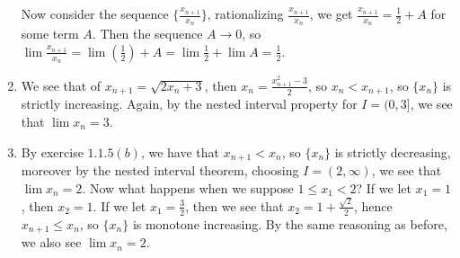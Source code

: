 \begin{enumerate}[label=(\arabic*)]
        Now consider the sequence  $\{\frac{x_{n+1}}{x_n}\}$, rationalizing 
        $\frac{x_{n+1}}{x_n}$, we get $\frac{x_{n+1}}{x_n}=\frac{1}{2}+A$ for some 
        term $A$. Then the sequence  $A \rightarrow 0$, so $\lim{\frac{x_{n+1}}{x_n}}=
        \lim{(\frac{1}{2})+A}=\lim{\frac{1}{2}}+\lim{A}=\frac{1}{2}$.

    \item We see that of $x_{n+1}=\sqrt{2x_n+3}$, then  $x_n=\frac{x_{n+1}^2-3}{2}$, 
        so $x_n<x_{n+1}$, so  $\{x_n\}$ is strictly increasing. Again, by the nested 
        interval property for  $I=(0,3]$, we see that $\lim{x_n}=3$.

    \item By exercise  $1.1.5(b)$, we have that  $x_{n+1}<x_n$, so  $\{x_n\}$ is 
        strictly decreasing, moreover by the nested interval theorem, choosing  $I=(2, \infty)$, 
        we see that  $\lim{x_n}=2$. Now what happens when we suppose  $1 \leq x_1<2$? 
        If we let $x_1=1$, then $x_2=1$. If we let  $x_1=\frac{3}{2}$, then we see 
        that $x_2=1+\frac{\sqrt{2}}{2}$, hence $x_{n+1} \leq x_n$, so $\{x_n\}$ is 
        monotone increasing. By the same reasoning as before, we also see $\lim{x_n}=2$.

\end{enumerate}

